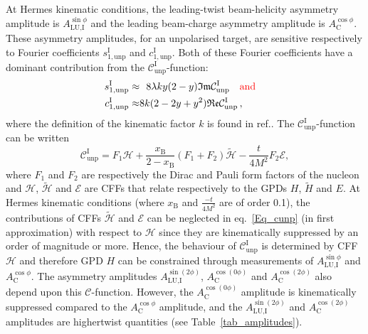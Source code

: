 At H{\sc ermes} kinematic conditions, the leading-twist beam-helicity asymmetry amplitude is $A_{\textrm{LU,I}}^{\sin\phi}$ and the leading beam-charge asymmetry amplitude is $A^{\cos\phi}_{\textrm{C}}$. These asymmetry amplitudes, for an unpolarised target, are sensitive respectively to Fourier coefficients $s_{1,\textrm{unp}}^{\textrm{I}}$ and $c_{1,\textrm{unp}}^{\textrm{I}}$. Both of these Fourier coefficients have a dominant contribution from the $\mathcal{C}_{\textrm{unp}}^{\textrm{I}}$-function:
\begin{eqnarray}
s_{1,\textrm{unp}}^{\textrm{I}} \approx&\,\,\,\,8\lambda ky(2-y)\mathfrak{Im}\mathcal{C}_{\textrm{unp}}^{\textrm{I}}\quad{\color{red}{\textrm{and}}\color{black}}&\label{eq:s1}
\\
 c_{1,\textrm{unp}}^{\textrm{I}} \approx&8k(2- 2y + y^{2})\mathfrak{Re}\mathcal{C}_{\textrm{unp}}^{\textrm{I}}\,,&\label{eq:c1}
\end{eqnarray}
where the definition of the kinematic factor $k$ is found
  in ref.\cite{Bel02b}. The $\mathcal{C}_{\textrm{unp}}^{\textrm{I}}$-function can be
written
\cite{Bel02b} 
\begin{equation}
 \mathcal{C}_{\textrm{unp}}^{\textrm{I}} = F_{1}\mathcal{H} + \frac{x_{\textrm{B}}}{2-x_{\textrm{B}}}(F_{1}+F_{2})\widetilde{\mathcal{H}} -\frac{t}{4M^{2}}F_{2}\mathcal{E},
\label{Eq_cunp}
\end{equation}
where $F_{1}$ and $F_{2}$ are respectively the Dirac and Pauli form
factors of the nucleon and $\mathcal{H}$, $\widetilde{\mathcal{H}}$ and
$\mathcal{E}$ are CFFs that relate respectively to the GPDs $H$,
$\widetilde{H}$ and $E$.  At H{\sc ermes} kinematic
conditions (where $x_{\textrm{B}}$ and $\frac{-t}{4M^2}$ are of order 0.1), the
contributions of CFFs $\widetilde{\mathcal{H}}$ and $\mathcal{E}$ can be
neglected in eq.~\ref{Eq_cunp} (in first approximation) with respect to $\mathcal{H}$ since they
are kinematically suppressed by an order of magnitude or more.
Hence, the behaviour of
$\mathcal{C}_{\textrm{unp}}^{\textrm{I}}$ is determined by CFF $\mathcal{H}$
and therefore GPD $H$ can be constrained through
measurements of $A_{\textrm{LU,I}}^{\sin\phi}$ and $A^{\cos\phi}_{\textrm{C}}$.
The asymmetry amplitudes $A_{\textrm{LU},\textrm{I}}^{\sin(2\phi)}$,
$A^{\cos(0\phi)}_{\textrm{C}}$ and $A^{\cos(2\phi)}_{\textrm{C}}$ also depend
upon this $\mathcal{C}$-function. However, the $A^{\cos(0\phi)}_{\textrm{C}}$ amplitude is kinematically suppressed compared to the $A^{\cos\phi}_{\textrm{C}}$ amplitude, and the  $A_{\textrm{LU,I}}^{\sin(2\phi)}$ and $A^{\cos(2\phi)}_{\textrm{C}}$ amplitudes are higher\red{-}twist quantities (see Table~\ref{tab_amplitudes}).

